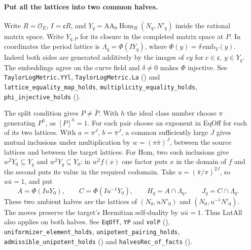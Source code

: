 \paragraph{Put all the lattices into two common halves.}
Write \(R=\mathcal O_E\), \(I=\mathfrak cR\), and
\(Y_q=\mathrm{AA}_0\operatorname{Hom}_{R}(N_q,N'_q)\) inside the
rational matrix space. Write \(Y_{q,P}\) for its closure in the completed
matrix space at \(P\). In coordinates the period lattice is
\(\Lambda_q=\Phi(IY_q)\), where \(\Phi(y)=\delta\,\mathrm{emb}_V(y)\).
Indeed both sides are generated additively by the images of \(c y\)
for \(c\in\mathfrak c,\ y\in Y_q\). The embeddings agree on the curve
field and \(\delta\ne0\) makes \(\Phi\) injective.
See \nolinkurl{TaylorLogMetric.YYl}, \nolinkurl{TaylorLogMetric.La}
()
and \nolinkurl{lattice_equality_map_holds}, \nolinkurl{multiplicity_equality_holds},
\nolinkurl{phi_injective_holds}
().

The split condition gives \(P\ne\bar P\). With \(h\) the ideal class
number choose \(\pi\) generating \(P^h\), as \([P]^h=1\).
For each pair choose an exponent in EqOff for each of its two
lattices. With \(a=\pi^J\), \(b=\bar\pi^J\), a common sufficiently
large \(J\) gives mutual inclusions under multiplication by
\(w=(\pi\bar\pi)^J\), between the source lattices and between the target
lattices. For Hom, two such inclusions give
\(w^2Y_0\subseteq Y_q\) and \(w^2Y_q\subseteq Y_0\): in \(w^2 f(x)\)
one factor puts \(x\) in the domain of \(f\) and the second puts its
value in the required codomain. Take
\(u=(\bar\pi/\pi)^{2J}\), so \(u\bar u=1\), and put
\[
 A=\Phi(IuY_0),\qquad C=\Phi(Iu^{-1}Y_0),\qquad
 H_q=A\cap\Lambda_q,\qquad J_q=C\cap\Lambda_q .
\]
These two ambient halves are the lattices of
\((N_0,uN'_0)\) and \((N_0,u^{-1}N'_0)\).
The moves preserve the target's Hermitian self-duality by \(u\bar u=1\).
Thus LatAll also applies on both halves.
See \nolinkurl{EqOff}, \nolinkurl{YP} and \nolinkurl{volP}
(),
\nolinkurl{uniformizer_element_holds}, \nolinkurl{unipotent_pairing_holds},
\nolinkurl{admissible_unipotent_holds}
()
and \nolinkurl{halvesRec_of_facts}
().

